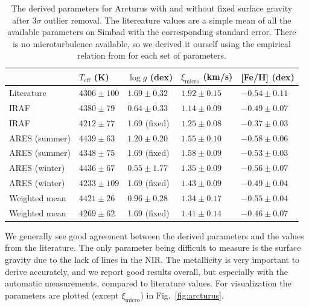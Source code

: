 \documentclass{aa}
\begin{document}
\begin{table}[htb!]
    \caption{The derived parameters for Arcturus with and without fixed surface
             gravity after 3$\sigma$ outlier removal. The litereature values are
             a simple mean of all the available parameters on Simbad with the
             corresponding standard error. There is no microturbulence
             available, so we derived it ourself using the empirical relation
             from \citet{Adibekyan2015} for each set of parameters.}
    \label{tab:arcturus}
    \centering
    \begin{tabular}{lllll}
      \hline\hline
                      & $T_\mathrm{eff}$ (K) &  $\log g$ (dex)  &   $\xi_\mathrm{micro}$ (km/s)   & [Fe/H] (dex)     \\
      \hline
        Literature    & $4306 \pm 100$       &  $1.69 \pm 0.32$ &    $1.92 \pm 0.15$              & $-0.54 \pm 0.11$ \\
      \hline
        IRAF          & $4380 \pm  79$       &  $0.64 \pm 0.33$ &    $1.14 \pm 0.09$              & $-0.49 \pm 0.07$ \\
        IRAF          & $4212 \pm  77$       &   1.69 (fixed)   &    $1.25 \pm 0.08$              & $-0.37 \pm 0.03$ \\
      \hline
        ARES (summer) & $4439 \pm  63$       &  $1.20 \pm 0.20$ &    $1.55 \pm 0.10$              & $-0.58 \pm 0.06$ \\
        ARES (summer) & $4348 \pm  75$       &   1.69 (fixed)   &    $1.58 \pm 0.09$              & $-0.53 \pm 0.03$ \\
        ARES (winter) & $4436 \pm  67$       &  $0.55 \pm 1.77$ &    $1.35 \pm 0.09$              & $-0.56 \pm 0.07$ \\
        ARES (winter) & $4233 \pm 109$       &   1.69 (fixed)   &    $1.43 \pm 0.09$              & $-0.49 \pm 0.04$ \\
      \hline
        Weighted mean & $4421 \pm  26$       &  $0.96 \pm 0.28$ &    $1.34 \pm 0.17$              & $-0.55 \pm 0.04$ \\
        Weighted mean & $4269 \pm  62$       &   1.69 (fixed)   &    $1.41 \pm 0.14$              & $-0.46 \pm 0.07$ \\
      \hline
    \end{tabular}
\end{table}

We generally see good agreement between the derived parameters and the values
from the literature. The only parameter being difficult to measure is the
surface gravity due to the lack of  lines in the NIR. The
metallicity is very important to derive accurately, and we report good results
overall, but especially with the automatic measurements, compared to literature
values. For visualization the parameters are plotted (except
$\xi_\mathrm{micro}$) in Fig.~\ref{fig:arcturus}.
\end{document}
